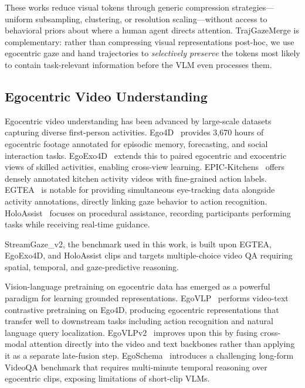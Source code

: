 These works reduce visual tokens through generic compression strategies—uniform subsampling,
clustering, or resolution scaling—without access to behavioral priors about where a human agent
directs attention.
TrajGazeMerge is complementary: rather than compressing visual representations post-hoc, we use
egocentric gaze and hand trajectories to \emph{selectively preserve} the tokens most likely to
contain task-relevant information before the VLM even processes them.

\subsection{Egocentric Video Understanding}

Egocentric video understanding has been advanced by large-scale datasets capturing diverse
first-person activities.
Ego4D~\cite{grauman2022ego4d} provides 3,670 hours of egocentric footage annotated for
episodic memory, forecasting, and social interaction tasks.
EgoExo4D~\cite{grauman2024egoexo4d} extends this to paired egocentric and exocentric views of
skilled activities, enabling cross-view learning.
EPIC-Kitchens~\cite{damen2022rescaling} offers densely annotated kitchen activity videos with
fine-grained action labels.
EGTEA~\cite{li2018egtea} is notable for providing simultaneous eye-tracking data alongside
activity annotations, directly linking gaze behavior to action recognition.
HoloAssist~\cite{wang2023holoassist} focuses on procedural assistance, recording participants
performing tasks while receiving real-time guidance.

StreamGaze\_v2, the benchmark used in this work, is built upon EGTEA, EgoExo4D, and HoloAssist
clips and targets multiple-choice video QA requiring spatial, temporal, and gaze-predictive
reasoning.

Vision-language pretraining on egocentric data has emerged as a powerful paradigm for
learning grounded representations.
EgoVLP~\cite{lin2022egovlp} performs video-text contrastive pretraining on Ego4D, producing
egocentric representations that transfer well to downstream tasks including action recognition
and natural language query localization.
EgoVLPv2~\cite{pramanick2023egovlpv2} improves upon this by fusing cross-modal attention
directly into the video and text backbones rather than applying it as a separate late-fusion step.
EgoSchema~\cite{mangalam2024egoschema} introduces a challenging long-form VideoQA benchmark
that requires multi-minute temporal reasoning over egocentric clips, exposing limitations of
short-clip VLMs.

